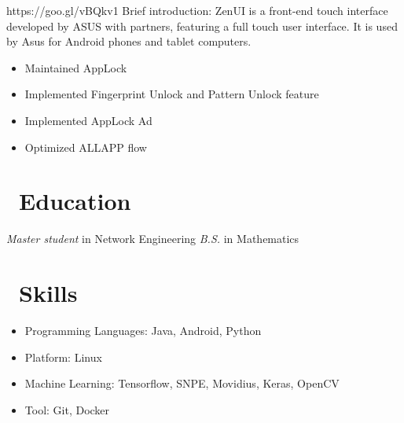 \documentclass{resume}
\begin{document}
 {https://goo.gl/vBQkv1}
Brief introduction: ZenUI is a front-end touch interface developed by ASUS with partners, featuring a full touch user interface. It is used by Asus for Android phones and tablet computers. 
\begin{itemize}
  \item Maintained AppLock
  \item Implemented Fingerprint Unlock and Pattern Unlock feature
  \item Implemented AppLock Ad
  \item Optimized ALLAPP flow
\end{itemize}

\section{\faGraduationCap\ Education}
\textit{Master student} in Network Engineering
\textit{B.S.} in Mathematics


\section{\faCogs\ Skills}
\begin{itemize}[parsep=0.5ex]
  \item Programming Languages: Java, Android, Python
  \item Platform: Linux
  \item Machine Learning: Tensorflow, SNPE, Movidius, Keras, OpenCV
  \item Tool: Git, Docker
\end{itemize}

%
%
\end{document}
